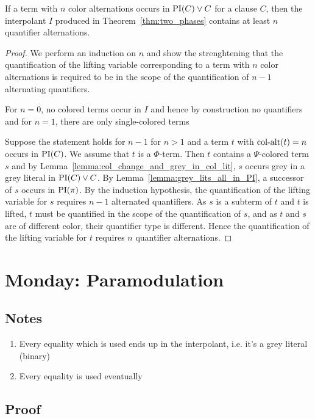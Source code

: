 \documentclass[,%
	draft=false,%
	numbers=noendperiod
	12pt,
	a4paper,
	oneside,%
	openany,
]{memoir}
\begin{document}
\begin{prop}
	If a term with $n$ color alternations occurs in $\operatorname{PI}(C) \lor C$ for a clause $C$, then the interpolant $I$ produced in Theorem~\ref{thm:two_phases} contains at least $n$ quantifier alternations.
\end{prop}
\begin{proof}
	We perform an induction on $n$
	and show the strenghtening that
	the quantification of the lifting variable corresponding to a term with $n$ color alternations is required to be in the scope of the quantification of $n-1$ alternating quantifiers.

	For $n=0$, no colored terms occur in $I$ and hence by construction no quantifiers
	and for $n=1$, there are only single-colored terms 

	Suppose the statement holds for $n-1$ for $n>1$ and a term $t$ with $\operatorname{col-alt}(t) = n$ occurs in $\operatorname{PI}(C)$.
	We assume that $t$ is a $\Phi$-term.
	Then $t$ contains a $\Psi$-colored term $s$ and
	by Lemma~\ref{lemma:col_change_and_grey_in_col_lit}, $s$ occurs grey in a grey literal in $\operatorname{PI}(C) \lor C$.
	By Lemma~\ref{lemma:grey_lits_all_in_PI}, a successor of $s$ occurs in $\operatorname{PI}(\pi)$.
	By the induction hypothesis, the quantification of the lifting variable for $s$ requires $n-1$ alternated quantifiers.
	As $s$ is a subterm of $t$ and $t$ is lifted, $t$ must be quantified in the scope of the quantification of $s$, and as $t$ and $s$ are of different color, their quantifier type is different. 
	Hence the quantification of the lifting variable for $t$ requires $n$ quantifier alternations.
\end{proof}

\section{Monday: Paramodulation}

\subsection{Notes}
\begin{enumerate}
	\item Every equality which is used ends up in the interpolant, i.e. it's a grey literal (binary)
	\item Every equality is used eventually
\end{enumerate}
\subsection{Proof}
\end{document}
